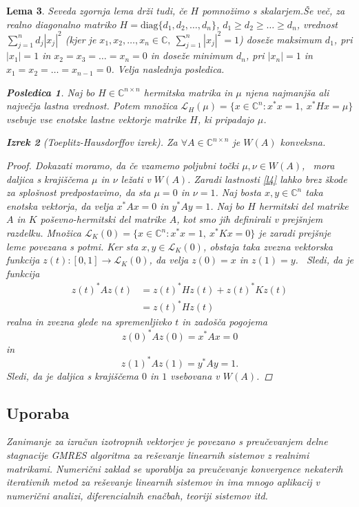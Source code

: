 \documentclass[12pt,a4paper]{amsart}\usepackage[slovene]{babel}%
\theoremstyle{definition}\newtheorem{definicija}{Definicija}[section]\newtheorem{primer}[definicija]{Primer}\newtheorem{opomba}[definicija]{Opomba}
\theoremstyle{plain}\newtheorem{lema}[definicija]{Lema}\newtheorem{izrek}[definicija]{Izrek}\newtheorem{trditev}[definicija]{Trditev}\newtheorem{posledica}[definicija]{Posledica}
\newcommand{\LH}{\mathcal{L}}\newcommand{\R}{\mathbb R}\newcommand{\N}{\mathbb N}\newcommand{\Z}{\mathbb Z}\newcommand{\C}{\mathbb C}\newcommand{\Q}{\mathbb Q}
\begin{document}
{\begin{lema}
Seveda zgornja lema drži tudi, če $H$ pomnožimo s skalarjem.Še več, za realno diagonalno matriko $H=\text{diag}\{d_1,d_2,\dots,d_n\}$, $d_1\geq d_2\geq \dots \geq d_n$, vrednost $\sum_{j=1}^{n} d_j|x_j|^2$ (kjer je $x_1,x_2,\dots, x_n \in \C,\ \sum_{j=1}^{n}|x_j|^2 =1$) doseže maksimum $d_1$, pri $|x_1|=1$ in $x_2=x_3=\dots=x_n=0$ in doseže minimum $d_n$, pri $|x_n|=1$ in $x_1=x_2=\dots=x_{n-1}=0$. Velja naslednja posledica.
\begin{posledica}\cite{zaloga}Naj bo $H\in \C^{n\times n}$ hermitska matrika in $\mu$ njena najmanjša ali največja lastna vrednost. Potem množica $\LH_{H}(\mu)=\{x\in \C^n\! : x^\ast x=1,\ x^\ast Hx=\mu \}$ vsebuje vse enotske lastne vektorje matrike $H$, ki pripadajo $\mu$.\end{posledica}
\begin{izrek}[\emph{Toeplitz-Hausdorffov izrek}]\cite{zaloga}Za $\forall A\in \C^{n\times n}$ je $W(A)$ konveksna.\end{izrek}
\begin{proof}Dokazati moramo, da če vzamemo poljubni točki $\mu, \nu \in W(A)$,  mora daljica s krajiščema $\mu$ in $\nu$ ležati v $W(A)$. Zaradi lastnosti \ref{l4} lahko brez škode za splošnost predpostavimo, da sta $\mu=0$ in $\nu=1$. Naj bosta $x,y\in \C^n$ taka enotska vektorja, da velja $x^\ast Ax=0$ in $y^\ast Ay=1$. Naj bo $H$ hermitski del matrike $A$ in $K$ poševno-hermitski del matrike $A$, kot smo jih definirali v prejšnjem razdelku. Množica $\LH_{K}(0) =\{x\in \C^n\! : x^\ast x=1,\ x^\ast Kx=0\}$ je zaradi prejšnje leme povezana s potmi. Ker sta $x,y\in \LH_{K}(0)$, obstaja taka zvezna vektorska funkcija $z(t): [0,1] \rightarrow \LH_{K}(0)$, da velja $z(0)=x$ in $z(1)=y$.  Sledi, da je funkcija \begin{align*}z(t)^\ast A z(t) &= z(t)^\ast Hz(t) +z(t)^\ast K z(t) \\ &= z(t)^\ast Hz(t)\end{align*}realna in zvezna glede na spremenljivko $t$ in zadošča pogojema $$z(0)^\ast Az(0)=x^\ast Ax=0$$ in $$z(1)^\ast Az(1)=y^\ast Ay=1.$$ Sledi, da je daljica s krajiščema $0$ in $1$ vsebovana v $W(A)$.\end{proof}
\subsection{Uporaba}Zanimanje za izračun izotropnih vektorjev je povezano s pre\-u\-če\-va\-njem delne stagnacije GMRES algoritma za reševanje linearnih sistemov z realnimi matrikami. Numerični zaklad se uporablja za preučevanje konvergence nekaterih iterativnih metod za reševanje linearnih sistemov in ima mnogo aplikacij v numerični analizi, diferencialnih enačbah, teoriji sistemov itd.%

\end{lema}}
\end{document}

